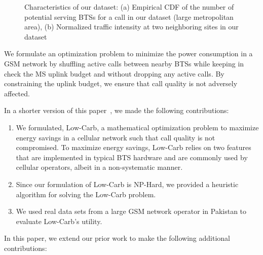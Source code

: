\begin{figure}
\centering
{}
\caption{Characteristics of our dataset: (a) Empirical CDF of the number of potential serving BTSs for a call in our dataset (large metropolitan area), (b) Normalized traffic intensity at two neighboring sites in our dataset} 
\label{fig:trafficmodelstats}
\end{figure}

We formulate an optimization problem to minimize the power
consumption in a GSM network by shuffling active calls between
nearby BTSs while keeping in check the MS uplink budget and without dropping any active calls. By constraining the uplink budget, we ensure that call quality is not adversely affected. 

In a shorter version of this paper~\cite{ilyas:lowcarb:globecom13}, we made the following contributions:
\begin{enumerate}
\item We formulated, Low-Carb, a mathematical optimization problem to maximize energy savings in a cellular network such that call quality is not compromised. To maximize energy savings, Low-Carb relies on two features that are implemented in typical BTS hardware and are commonly used by cellular operators, albeit in a non-systematic manner.
\item Since our formulation of Low-Carb is NP-Hard, we provided a heuristic algorithm for solving the Low-Carb problem.
\item We used real data sets from a large GSM network operator in Pakistan to evaluate Low-Carb's utility.
\end{enumerate}
In this paper, we extend our prior work to make the following additional contributions:

